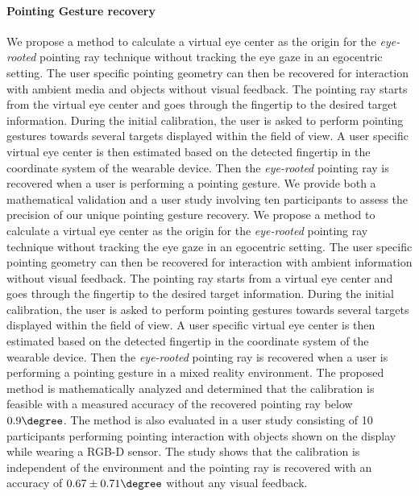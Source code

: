 \paragraph{Pointing Gesture recovery}  
We propose a method to calculate a virtual eye center as the origin for the \textit{eye-rooted} pointing ray technique without tracking the eye gaze in an egocentric setting. The user specific pointing geometry can then be recovered for interaction with ambient media and objects without visual feedback. The pointing ray starts from the virtual eye center and goes through the fingertip to the desired target information. During the initial calibration, the user is asked to perform pointing gestures towards several targets displayed within the field of view. A user specific virtual eye center is then estimated based on the detected fingertip in the coordinate system of the wearable device. Then the \textit{eye-rooted} pointing ray is recovered when a user is performing a pointing gesture. We provide both a mathematical validation and a user study involving ten participants to assess the precision of our unique pointing gesture recovery.
We propose a method to calculate a virtual eye center as the origin for the \textit{eye-rooted} pointing ray technique without tracking the eye gaze in an egocentric setting. The user specific pointing geometry can then be recovered for interaction with ambient information without visual feedback. The pointing ray starts from a virtual eye center and goes through the fingertip to the desired target information. During the initial calibration, the user is asked to perform pointing gestures towards several targets displayed within the field of view. A user specific virtual eye center is then estimated based on the detected fingertip in the coordinate system of the wearable device. Then the \textit{eye-rooted} pointing ray is recovered when a user is performing a pointing gesture in a mixed reality environment. The proposed method is mathematically analyzed and determined that the calibration is feasible with a measured accuracy of the recovered pointing ray below $0.9\degree$.
The method is also evaluated in a user study consisting of 10 participants performing pointing interaction with objects shown on the display while wearing a RGB-D sensor. The study shows that the calibration is independent of the environment and the pointing ray is recovered with an accuracy of $0.67 \pm 0.71\degree$ without any visual feedback.

